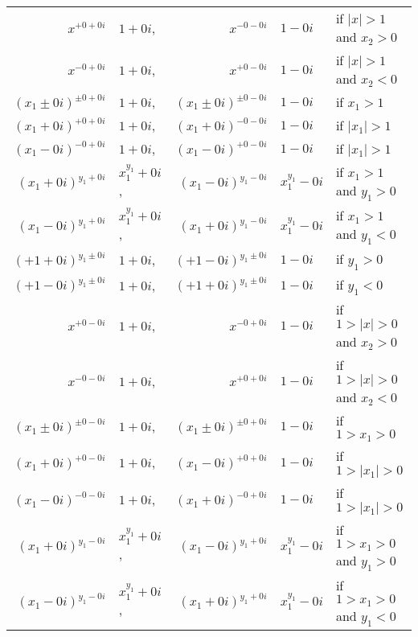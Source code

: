 \documentclass [11pt]{article}
\begin{document}
\begin{tabular}{r@{ $=$ }lr@{ $=$ }ll}
  $x^{+0 +0i}$ & $1 +0i$,&
  $x^{-0 -0i}$ & $1 -0i$ &
  if $|x|>1$ and $x_2>0$\\
  $x^{-0 +0i}$ & $1 +0i$,&
  $x^{+0 -0i}$ & $1 -0i$ &
  if $|x|>1$ and $x_2<0$\\

  $(x_1 \pm 0i)^{\pm0 +0i}$ & $1 +0i$,&
  $(x_1 \pm 0i)^{\pm0 -0i}$ & $1 -0i$ &
  if $x_1>1$\\

  $(x_1 +0i)^{+0 +0i}$ & $1 +0i$, &
  $(x_1 +0i)^{-0 -0i}$ & $1 -0i$ &
  if $|x_1|>1$\\
  $(x_1 -0i)^{-0 +0i}$ & $1 +0i$, &
  $(x_1 -0i)^{+0 -0i}$ & $1 -0i$ &
  if $|x_1|>1$\\

  $(x_1 +0i)^{y_1 +0i}$ & $x_1^{y_1} +0i$, &
  $(x_1 -0i)^{y_1 -0i}$ & $x_1^{y_1} -0i$ &
  if $x_1>1$ and $y_1>0$\\
  $(x_1 -0i)^{y_1 +0i}$ & $x_1^{y_1} +0i$, &
  $(x_1 +0i)^{y_1 -0i}$ & $x_1^{y_1} -0i$ &
  if $x_1>1$ and $y_1<0$\\

  $(+1 +0i)^{y_1 \pm0i}$ & $1 +0i$, &
  $(+1 -0i)^{y_1 \pm0i}$ & $1 -0i$ &
  if $y_1>0$\\
  $(+1 -0i)^{y_1 \pm0i}$ & $1 +0i$, &
  $(+1 +0i)^{y_1 \pm0i}$ & $1 -0i$ &
  if $y_1<0$\\

  $x^{+0 -0i}$ & $1 +0i$, &
  $x^{-0 +0i}$ & $1 -0i$ &
  if $1>|x|>0$ and $x_2>0$\\
  $x^{-0 -0i}$ & $1 +0i$, &
  $x^{+0 +0i}$ & $1 -0i$ &
  if $1>|x|>0$ and $x_2<0$\\

  $(x_1 \pm0i)^{\pm0 -0i}$ & $1 +0i$, &
  $(x_1 \pm0i)^{\pm0 +0i}$ & $1 -0i$ &
  if $1 > x_1 > 0$ \\

  $(x_1 +0i)^{+0 -0i}$ & $1 +0i$, &
  $(x_1 -0i)^{+0 +0i}$ & $1 -0i$ &
  if $1 > |x_1| > 0$ \\
  $(x_1 -0i)^{-0 -0i}$ & $1 +0i$, &
  $(x_1 +0i)^{-0 +0i}$ & $1 -0i$ &
  if $1 > |x_1| > 0$ \\

  $(x_1 +0i)^{y_1 -0i}$ & $x_1^{y_1} +0i$, &
  $(x_1 -0i)^{y_1 +0i}$ & $x_1^{y_1} -0i$ &
  if $1 > x_1 > 0$ and $y_1 > 0$ \\
  $(x_1 -0i)^{y_1 -0i}$ & $x_1^{y_1} +0i$, &
  $(x_1 +0i)^{y_1 +0i}$ & $x_1^{y_1} -0i$ &
  if $1 > x_1 > 0$ and $y_1 < 0$ \\


\end{tabular}
\end{document}
